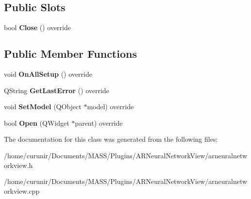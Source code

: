 \subsection*{Public Slots}
\begin{DoxyCompactItemize}
\item 
bool {\bfseries Close} () override\hypertarget{class_a_r_neural_network_view_ae72f15b3cabb9671d3193b1a0a389b5d}{}\label{class_a_r_neural_network_view_ae72f15b3cabb9671d3193b1a0a389b5d}

\end{DoxyCompactItemize}
\subsection*{Public Member Functions}
\begin{DoxyCompactItemize}
\item 
void {\bfseries On\+All\+Setup} () override\hypertarget{class_a_r_neural_network_view_adfd8b5d501011015ce400df5c43a52da}{}\label{class_a_r_neural_network_view_adfd8b5d501011015ce400df5c43a52da}

\item 
Q\+String {\bfseries Get\+Last\+Error} () override\hypertarget{class_a_r_neural_network_view_ad6bd977f54c1f9683bdcec3599c8b2b1}{}\label{class_a_r_neural_network_view_ad6bd977f54c1f9683bdcec3599c8b2b1}

\item 
void {\bfseries Set\+Model} (Q\+Object $\ast$model) override\hypertarget{class_a_r_neural_network_view_a1db4e02fbfb62f194d2ffe76f9fb5bc7}{}\label{class_a_r_neural_network_view_a1db4e02fbfb62f194d2ffe76f9fb5bc7}

\item 
bool {\bfseries Open} (Q\+Widget $\ast$parent) override\hypertarget{class_a_r_neural_network_view_ad6df97a34949027264a221952677e92d}{}\label{class_a_r_neural_network_view_ad6df97a34949027264a221952677e92d}

\end{DoxyCompactItemize}


The documentation for this class was generated from the following files\+:\begin{DoxyCompactItemize}
\item 
/home/curunir/\+Documents/\+M\+A\+S\+S/\+Plugins/\+A\+R\+Neural\+Network\+View/arneuralnetworkview.\+h\item 
/home/curunir/\+Documents/\+M\+A\+S\+S/\+Plugins/\+A\+R\+Neural\+Network\+View/arneuralnetworkview.\+cpp\end{DoxyCompactItemize}
